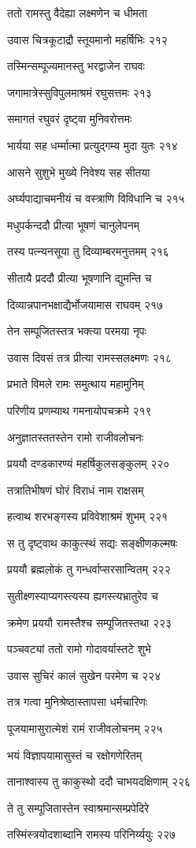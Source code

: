 ततो रामस्तु वैदेह्या लक्ष्मणेन च धीमता

उवास चित्रकूटाद्रौ स्तूयमानो महर्षिभिः २१२

तस्मिन्सम्पूज्यमानस्तु भरद्वाजेन राघवः

जगामात्रेस्सुविपुलमाश्रमं रघुसत्तमः २१३

समागतं रघुवरं दृष्ट्वा मुनिवरोत्तमः

भार्यया सह धर्म्मात्मा प्रत्युद्गम्य मुदा युतः २१४

आसने सुशुभे मुख्ये निवेश्य सह सीतया

अर्घ्यपाद्याचमनीयं च वस्त्राणि विविधानि च २१५

मधुपर्कन्ददौ प्रीत्या भूषणं चानुलेपनम्

तस्य पत्न्यनसूया तु दिव्याम्बरमनुत्तमम् २१६

सीतायै प्रददौ प्रीत्या भूषणानि द्युमन्ति च

दिव्यान्नपानभक्षाद्यैर्भोजयामास राघवम् २१७

तेन सम्पूजितस्तत्र भक्त्या परमया नृपः

उवास दिवसं तत्र प्रीत्या रामस्सलक्ष्मणः २१८

प्रभाते विमले रामः समुत्थाय महामुनिम्

परिणीय प्रणम्याथ गमनायोपचक्रमे २१९

अनुज्ञातस्ततस्तेन रामो राजीवलोचनः

प्रययौ दण्डकारण्यं महर्षिकुलसङ्कुलम् २२०

तत्रातिभीषणं घोरं विराधं नाम राक्षसम्

हत्वाथ शरभङ्गस्य प्रविवेशाश्रमं शुभम् २२१

स तु दृष्ट्वाथ काकुत्स्थं सद्यः सङ्क्षीणकल्मषः

प्रययौ ब्रह्मलोकं तु गन्धर्वाप्सरसान्वितम् २२२

सुतीक्ष्णस्याप्यगस्त्यस्य ह्यगस्त्यभ्रातुरेव च

क्रमेण प्रययौ रामस्तैश्च सम्पूजितस्तथा २२३

पञ्चवट्यां ततो रामो गोदावर्यास्तटे शुभे

उवास सुचिरं कालं सुखेन परमेण च २२४

तत्र गत्वा मुनिश्रेष्ठास्तापसा धर्मचारिणः

पूजयामासुरात्मेशं रामं राजीवलोचनम् २२५

भयं विज्ञापयामासुस्तं च रक्षोगणेरितम्

तानाश्वास्य तु काकुस्थो ददौ चाभयदक्षिणाम् २२६

ते तु सम्पूजितास्तेन स्वाश्रमान्सम्प्रपेदिरे

तस्मिंस्त्रयोदशाब्दानि रामस्य परिनिर्य्ययुः २२७

